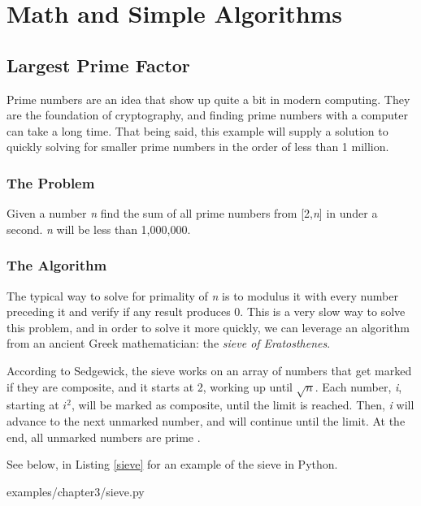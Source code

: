 \documentclass[12pt, oneside, a4paper]{book}
\begin{document}
      \section{Math and Simple Algorithms}
         \subsection{Largest Prime Factor}
         Prime numbers are an idea that show up quite a bit in modern computing.
         They are the foundation of cryptography, and finding prime numbers with a computer can take a long time.
         That being said, this example will supply a solution to quickly solving for smaller prime numbers in the order of less than 1 million.

         \subsubsection{The Problem}
         Given a number \textit{n} find the sum of all prime numbers from [2,\textit{n}] in under a second.
         \textit{n} will be less than 1,000,000.

         \subsubsection{The Algorithm}
         The typical way to solve for primality of \textit{n} is to modulus it with every number preceding it and verify if any result produces 0.
         This is a very slow way to solve this problem, and in order to solve it more quickly, we can leverage an algorithm from an ancient Greek mathematician: the \textit{sieve of Eratosthenes}.

         According to Sedgewick, the sieve works on an array of numbers that get marked if they are composite, and it starts at 2, working up until $\sqrt{n}$.
         Each number, \textit{i}, starting at \textit{$i^2$}, will be marked as composite, until the limit is reached.
         Then, \textit{i} will advance to the next unmarked number, and will continue until the limit.
         At the end, all unmarked numbers are prime \autocite{sedgewickAlgorithms1992}.

         See below, in Listing \ref{sieve} for an example of the sieve in Python.
         
         {examples/chapter3/sieve.py}
\end{document}
